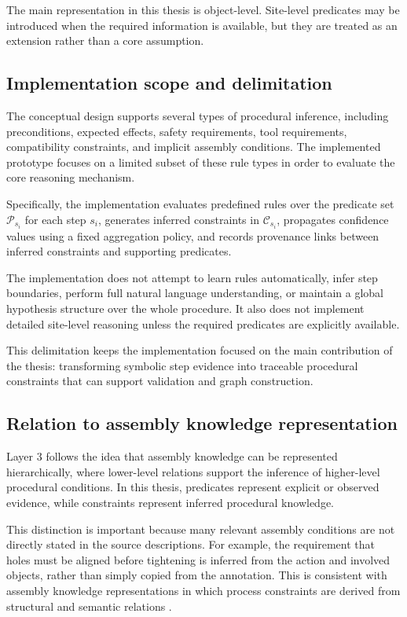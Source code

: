 The main representation in this thesis is object-level. Site-level predicates may be introduced when the required information is available, but they are treated as an extension rather than a core assumption.


\subsection{Implementation scope and delimitation}

The conceptual design supports several types of procedural inference, including preconditions, expected effects, safety requirements, tool requirements, compatibility constraints, and implicit assembly conditions. The implemented prototype focuses on a limited subset of these rule types in order to evaluate the core reasoning mechanism.

Specifically, the implementation evaluates predefined rules over the predicate set $\mathcal{P}_{s_i}$ for each step $s_i$, generates inferred constraints in $\mathcal{C}_{s_i}$, propagates confidence values using a fixed aggregation policy, and records provenance links between inferred constraints and supporting predicates.

The implementation does not attempt to learn rules automatically, infer step boundaries, perform full natural language understanding, or maintain a global hypothesis structure over the whole procedure. It also does not implement detailed site-level reasoning unless the required predicates are explicitly available.

This delimitation keeps the implementation focused on the main contribution of the thesis: transforming symbolic step evidence into traceable procedural constraints that can support validation and graph construction.

\subsection{Relation to assembly knowledge representation}

Layer 3 follows the idea that assembly knowledge can be represented hierarchically, where lower-level relations support the inference of higher-level procedural conditions. In this thesis, predicates represent explicit or observed evidence, while constraints represent inferred procedural knowledge.

This distinction is important because many relevant assembly conditions are not directly stated in the source descriptions. For example, the requirement that holes must be aligned before tightening is inferred from the action and involved objects, rather than simply copied from the annotation. This is consistent with assembly knowledge representations in which process constraints are derived from structural and semantic relations \citep{Zhu_2022}.



